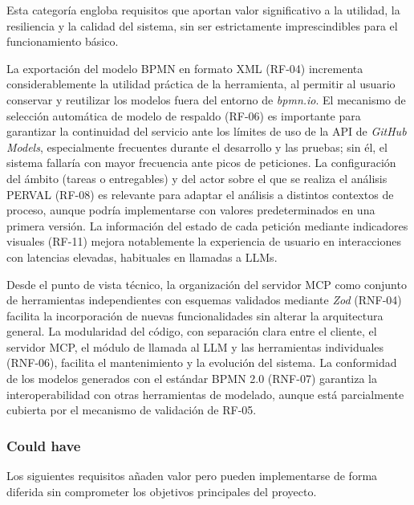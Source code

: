 {Esta categoría engloba requisitos que aportan valor significativo a la utilidad, la resiliencia y la calidad del sistema, sin ser estrictamente imprescindibles para el funcionamiento básico.

La exportación del modelo BPMN en formato XML (RF-04) incrementa considerablemente la utilidad práctica de la herramienta, al permitir al usuario conservar y reutilizar los modelos fuera del entorno de \textit{bpmn.io}. El mecanismo de selección automática de modelo de respaldo (RF-06) es importante para garantizar la continuidad del servicio ante los límites de uso de la API de \textit{GitHub Models}, especialmente frecuentes durante el desarrollo y las pruebas; sin él, el sistema fallaría con mayor frecuencia ante picos de peticiones. La configuración del ámbito (tareas o entregables) y del actor sobre el que se realiza el análisis PERVAL (RF-08) es relevante para adaptar el análisis a distintos contextos de proceso, aunque podría implementarse con valores predeterminados en una primera versión. La información del estado de cada petición mediante indicadores visuales (RF-11) mejora notablemente la experiencia de usuario en interacciones con latencias elevadas, habituales en llamadas a LLMs.

Desde el punto de vista técnico, la organización del servidor MCP como conjunto de herramientas independientes con esquemas validados mediante \textit{Zod} (RNF-04) facilita la incorporación de nuevas funcionalidades sin alterar la arquitectura general. La modularidad del código, con separación clara entre el cliente, el servidor MCP, el módulo de llamada al LLM y las herramientas individuales (RNF-06), facilita el mantenimiento y la evolución del sistema. La conformidad de los modelos generados con el estándar BPMN 2.0 (RNF-07) garantiza la interoperabilidad con otras herramientas de modelado, aunque está parcialmente cubierta por el mecanismo de validación de RF-05.

\subsubsection*{Could have}

Los siguientes requisitos añaden valor pero pueden implementarse de forma diferida sin comprometer los objetivos principales del proyecto.

}
